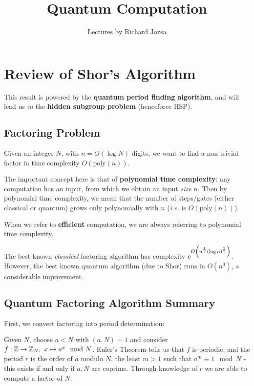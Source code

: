 \documentclass[]{article}
\title{Quantum Computation}
\author{Lectures by Richard Jozsa}
\date{}
\begin{document}
\maketitle

\tableofcontents
\clearpage
{}
\section{Review of Shor's Algorithm}

This result is powered by the \textbf{quantum period finding algorithm}, and will lead us to the \textbf{hidden subgroup problem} (henceforce HSP).

\subsection{Factoring Problem}

Given an integer $N$, with $n = O(\log N)$ digits, we want to find a non-trivial factor in time complexity $O(\textrm{poly}(n))$.

The important concept here is that of \textbf{polynomial time complexity}: any computation has an input, from which we obtain an input \textit{size} $n$. Then by polynomial time complexity, we mean that the number of steps/gates (either classical or quantum) grows only polynomially with $n$ (\textit{i.e.} is $O(\textrm{poly}(n))$).

When we refer to \textbf{efficient} computation, we are always referring to polynomial time complexity.

The best known \textit{classical} factoring algorithm has complexity $\mathrm{e}^{O\left( n^{\frac{1}{3}}(\log n)^{\frac{2}{3}}\right)}$. However, the best known quantum algorithm (due to Shor) runs in $O(n^3)$, a considerable improvement.

\subsection{Quantum Factoring Algorithm Summary}

First, we convert factoring into period determination:

Given $N$, choose $a<N$ with $(a,N) = 1$ and consider $f:\mathbb{Z} \rightarrow \mathbb{Z}_N,\ x\mapsto a^x \mod N$. Euler's Theorem tells us that $f$ is periodic, and the period $r$ is the order of $a$ modulo $N$, \ie the least $m > 1$ such that $a^m \equiv 1 \mod N$ - this exists if and only if $a,N$ are coprime. Through knowledge of $r$ we are able to compute a factor of $N$.
\end{document}
